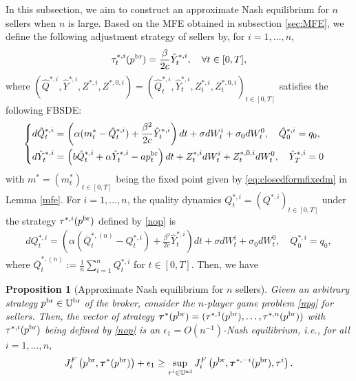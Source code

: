 \documentclass[11pt]{article}
\newtheorem{proposition}[theorem]{Proposition}
\numberwithin{equation}{section}
\begin{document}
In this subsection, we aim to construct an approximate Nash equilibrium for $n$ sellers when $n$ is large. Based on the MFE obtained in subsection \ref{sec:MFE}, we define the following adjustment strategy of sellers by, for $i=1, \ldots, n$,
	\begin{align}\label{nop}
		\tau_t^{*, i}(p^{{\rm br}})=\frac{\beta}{2c}\hat{Y}_t^{*, i},\quad\forall t \in [0, T],
	\end{align}
where $(\hat{Q}^{*,i},\hat{Y}^{*,i},Z^{*,i},Z^{*,0,i})=(\hat{Q}_t^{*,i},\hat{Y}_t^{*,i},Z_t^{*,i},Z_t^{*,0,i})_{t\in[0,T]}$ satisfies the following FBSDE:
	\begin{align}\label{audynamic}
		\begin{cases}
\displaystyle d\hat{Q}_t^{*, i}=\left(\alpha (m_t^*-\hat{Q}_t^{*, i})+\frac{\beta ^2}{2c }\hat{Y}_t^{*, i}\right)dt+\sigma dW_t^i+\sigma_0 dW_t^0,  \quad \hat{Q}_0^{*,i}=q_0,\\[0.8em]
\displaystyle d\hat{Y}_t^{*, i}=\left(b \hat{Q}_t^{*, i}+\alpha  \hat{Y}_t^{*, i}- a p_t^{{\rm br}}\right)dt+Z_t^{*,i}dW_t^i+Z_t^{*,0,i}dW_t^0,\quad  \hat{Y}_T^{*, i}=0
		\end{cases}
\end{align} 
with $m^*=(m_t^{*})_{t\in[0,T]}$ being the fixed point given by \eqref{eq:closedformfixedm} in Lemma \autoref{mfe}. For $i=1,\ldots, n$, the quality dynamics $Q_t^{*,i} =(Q^{*,i})_{t\in[0,T]}$ under the strategy $\tau^{*,i}(p^{\rm br})$ defined by \eqref{nop} is
\begin{align}\label{ndynamic}
dQ_t^{*,i}=\left(\alpha\left(\overline{Q}_t^{*, (n)}-Q_t^{*,i}\right)+\frac{\beta ^2}{2c }\hat{Y}_t^{*, i}\right)dt+\sigma  dW_t^i+\sigma_0 dW_t^0, \quad  Q_0^{*,i}=q_0, 
\end{align}
where $\overline{Q}_t^{*, (n)}:=\frac{1}{n}\sum_{i=1}^n Q_t^{*, i}$ for $t\in[0,T]$. Then, we have
\begin{proposition}[Approximate Nash equilibrium for $n$ sellers]\label{ANE}
Given an arbitrary strategy $p^{\rm br} \in \mathbb{U}^{\rm br}$ of the broker, consider the $n$-player game problem \eqref{npg} for sellers. Then, the vector of strategy $\boldsymbol{\tau}^*(p^{{\rm br}})=(\tau^{*,1}(p^{{\rm br}}), \ldots, \tau^{*,n}(p^{{\rm br}}))$ with $\tau^{*,i}(p^{\rm br})$ being defined by \eqref{nop} is an $\epsilon_1=O(n^{-1})$-Nash equilibrium, i.e., for all $i=1,\ldots,n$, 
\begin{align*}
J_i^F\left(p^{{\rm br}},\boldsymbol{\tau}^*(p^{{\rm br}})\right)+\epsilon_1\geq \sup_{\tau^i\in \mathbb{U}^{\rm ad}}J_i^F\left(p^{{\rm br}},\boldsymbol{\tau}^{*,-i}(p^{{\rm br}}), \tau^i\right).    
\end{align*}
\end{proposition}
\end{document}
